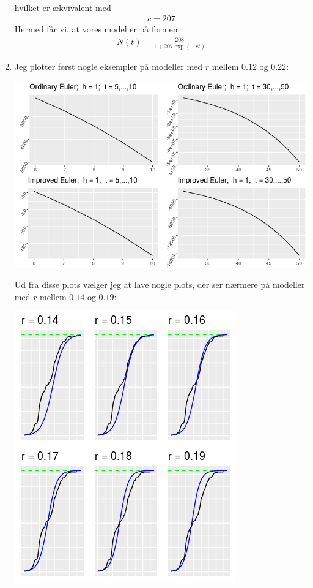 \documentclass[12pt]{article}
\begin{document}
\begin{enumerate}
\begin{align}
\end{align}
hvilket er ækvivalent med
\begin{align}
c = 207
\end{align}
Hermed får vi, at vores model er på formen
\begin{align}
N(t) = \frac{208}{1 + 207\exp(-rt)}
\end{align}
\item Jeg plotter først nogle eksempler på modeller med $r$ mellem $0.12$ og $0.22$:
\begin{center}
\includegraphics[scale=0.8]{q2p3.png}
\end{center}
Ud fra disse plots vælger jeg at lave nogle plots, der ser nærmere på modeller med $r$ mellem $0.14$ og $0.19$:
\begin{center}
\includegraphics[scale=0.8]{q2p4.png}

\end{center}
\end{enumerate}
\end{document}
